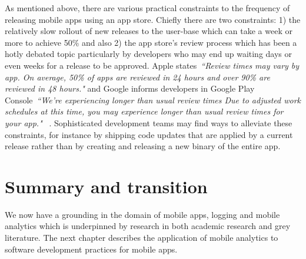 As mentioned above, there are various practical constraints to the frequency of releasing mobile apps using an app store. Chiefly there are two constraints: 1) the relatively slow rollout of new releases to the user-base which can take a week or more to achieve 50\% and also 2) the app store's review process which has been a hotly debated topic particularly by developers who may end up waiting days or even weeks for a release to be approved. Apple states~\emph{``Review times may vary by app. On average, 50\% of apps are reviewed in 24 hours and over 90\% are reviewed in 48 hours."} and Google informs developers in Google Play Console~\emph{``We're experiencing longer than usual review times
Due to adjusted work schedules at this time, you may experience longer than usual review times for your app."} ~. Sophisticated development teams may find ways to alleviate these constraints, for instance by shipping code updates that are applied by a current release rather than by creating and releasing a new binary of the entire app.


\section{Summary and transition}
We now have a grounding in the domain of mobile apps, logging and mobile analytics which is underpinned by research in both academic research and grey literature. The next chapter describes the application of mobile analytics to software development practices for mobile apps.